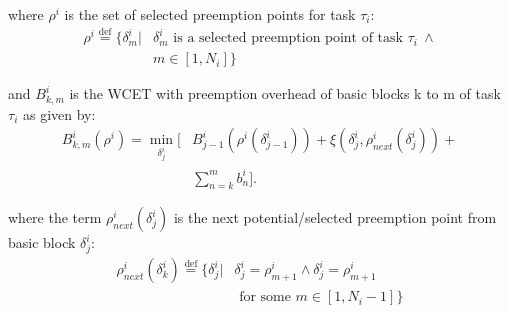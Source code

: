 \noindent
where \begin{math}\rho^{i}\end{math} is the set of selected preemption points for task \begin{math}\tau_{i}\end{math}:
\begin{equation}\label{eqn:pp-set}
\begin{split}
   \rho^{i} \stackrel{\text{def}}{=} \{\delta_{m}^{i}|&\delta_{m}^{i} \text{ is a selected preemption point of task } \tau_{i}\ \wedge \\ &m \in [1,N_{i}]\}
\end{split}
\end{equation}

\noindent
and \begin{math}B_{k,m}^{i}\end{math} is the WCET with preemption overhead of basic blocks k to m of task \begin{math}\tau_{i}\end{math} as given by:
\begin{equation}\label{eqn:bbkwcet-cost}
\begin{split}
   B_{k,m}^{i}(\rho^{i}) = \min_{\delta_{j}^{i}} \Big[&B_{j-1}^{i}(\rho^{i}(\delta_{j-1}^{i})) + \xi(\delta_{j}^{i},\rho_{next}^{i}(\delta_{j}^{i})) + \\ &\sum_{n=k}^{m}b_{n}^{i}\Big].
\end{split}
\end{equation}

\noindent
where the term \begin{math}\rho_{next}^{i}(\delta_{j}^{i})\end{math} is the next potential/selected preemption point from basic block \begin{math}\delta_{j}^{i}\end{math}:
\begin{equation}\label{eqn:ppnext-set}
\begin{split}
   \rho_{next}^{i}(\delta_{k}^{i}) \stackrel{\text{def}}{=} \{\delta_{j}^{i}|&\delta_{j}^{i} = \rho_{m+1}^{i} \wedge \delta_{j}^{i} = \rho_{m+1}^{i} \\ &\textrm{ for some } m \in [1,N_{i}-1]\}
\end{split}
\end{equation}

